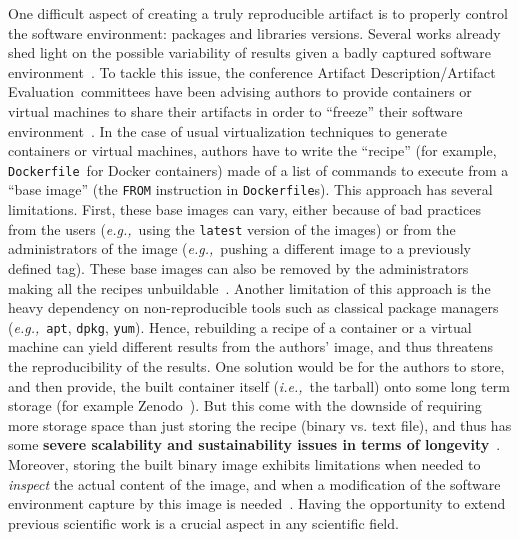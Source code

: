 \documentclass[sigconf,natbib=false]{acmart}
\newcommand{\ie}{\emph{i.e.,}}
\newcommand{\eg}{\emph{e.g.,}}
\newcommand{\ad}{Artifact Description}
\newcommand{\aeval}{Artifact Evaluation}
\newcommand{\adae}{\ad/\aeval}
\newcommand{\df}{\texttt{Dockerfile}}
\newcommand{\todo}[1]{{\color{red}{TODO: #1}}}
\begin{document}
One difficult aspect of creating a truly reproducible artifact is to properly control the software environment: packages and libraries versions.
Several works already shed light on the possible variability of results given a badly captured software environment~\cite{mytkowicz_producing_nodate, sokolowski2024impact}.
To tackle this issue, the conference \adae\ committees have been advising authors to provide containers or virtual machines to share their artifacts in order to ``freeze'' their software environment~\cite{eurosys25, aetips, csartifacts}.
In the case of usual virtualization techniques to generate containers or virtual machines, authors have to write the ``recipe'' (for example, \df\ for Docker containers) made of a list of commands to execute from a ``base image'' (the \texttt{FROM} instruction in \df s).
This approach has several limitations.
First, these base images can vary, either because of bad practices from the users (\eg\ using the \texttt{latest} version of the images) or from the administrators of the image (\eg\ pushing a different image to a previously defined tag).
These base images can also be removed by the administrators making all the recipes unbuildable~\cite{nvidia_cuda_lifetime}.
Another limitation of this approach is the heavy dependency on non-reproducible tools such as classical package managers (\eg\ \texttt{apt}, \texttt{dpkg}, \texttt{yum}).
Hence, rebuilding a recipe of a container or a virtual machine can yield different results from the authors' image, and thus threatens the reproducibility of the results.
One solution would be for the authors to store, and then provide, the built container itself (\ie\ the tarball) onto some long term storage (for example Zenodo~\cite{zenodo}).
But this come with the downside of requiring more storage space than just storing the recipe (binary vs. text file), and thus has some \textbf{severe scalability and sustainability issues in terms of longevity}~\cite{monroe2023preservation, guilloteau2024longevity}.
Moreover, storing the built binary image exhibits limitations when needed to \emph{inspect} the actual content of the image, and when a modification of the software environment capture by this image is needed~\cite{mercier2018considering}.
Having the opportunity to extend previous scientific work is a crucial aspect in any scientific field.


\end{document}
